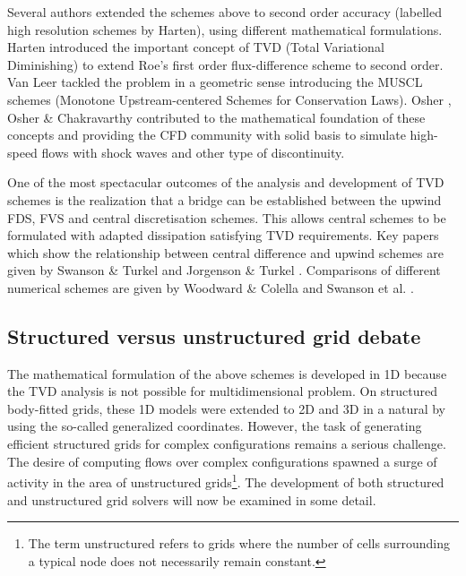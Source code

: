  Several authors extended the schemes above to second order accuracy
 (labelled high resolution schemes by Harten), using different mathematical
 formulations.
 Harten \citeyear{Harten:1} introduced the important concept of TVD
 (Total Variational Diminishing) to extend Roe's first order
 flux-difference scheme to second order.
 Van Leer \citeyear{Leer:1,Leer:2,Leer:3,Leer:4}
 tackled the problem in a geometric sense introducing the MUSCL schemes (Monotone 
 Upstream-centered Schemes for Conservation Laws).
 Osher \citeyear{Osher:1}, Osher \& Chakravarthy \citeyear{Osher:2}
 contributed to the mathematical foundation of these concepts and providing
 the CFD community with solid basis to simulate high-speed flows
 with shock waves and other type of discontinuity.

 One of the most spectacular outcomes of the analysis and development
 of TVD schemes is the realization that a bridge can be established
 between the upwind FDS, FVS and central discretisation schemes.
 This allows central schemes to be formulated with adapted dissipation
 satisfying TVD requirements.
 Key papers which show the relationship between central difference and
 upwind schemes are given by Swanson \& Turkel \citeyear{Turkel:1}
 and Jorgenson \& Turkel \citeyear{Turkel:2}.
 Comparisons of different numerical schemes are given by
 Woodward \& Colella \citeyear{Colella:1} and
 Swanson et al. \citeyear{Turkel:3}.
%
%
\subsection{Structured versus unstructured grid debate}
%
 The mathematical formulation of the above schemes is developed in 1D
 because the TVD analysis is not possible for multidimensional problem.
 On structured body-fitted grids, these 1D models were extended to 2D and 3D
 in a natural by using the so-called generalized coordinates.
 However, the task of generating efficient structured grids for complex
 configurations remains a serious challenge.
 The desire of computing flows over complex configurations spawned a surge of activity in the area
 of unstructured grids\footnote{The term unstructured refers to grids
 where the number of cells surrounding a typical node does not
 necessarily remain constant.}.
 The development of both structured and unstructured grid solvers will
 now be examined in some detail.
 
